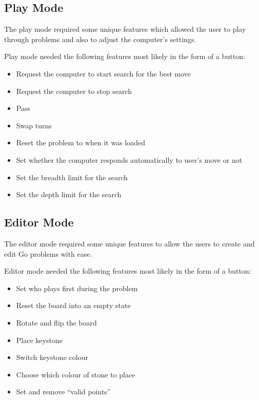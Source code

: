 \documentclass{l4proj}
\begin{document}
\subsection{Play Mode}
The play mode required some unique features which allowed the user to play through problems and also to adjust the computer’s settings.

Play mode needed the following features most likely in the form of a button:
\begin{itemize}
\item Request the computer to start search for the best move
\item Request the computer to stop search
\item Pass
\item Swap turns
\item Reset the problem to when it was loaded
\item Set whether the computer responds automatically to user’s move or not
\item Set the breadth limit for the search
\item Set the depth limit for the search
\end{itemize}

\subsection{Editor Mode}
The editor mode required some unique features to allow the users to create and edit  Go problems with ease.

Editor mode needed the following features most likely in the form of a button:
\begin{itemize}
\item Set who plays first during the problem
\item Reset the board into an empty state
\item Rotate and flip the board
\item Place keystone
\item Switch keystone colour
\item Choose which colour of stone to place
\item Set and remove “valid points”
\end{itemize}
\end{document}
